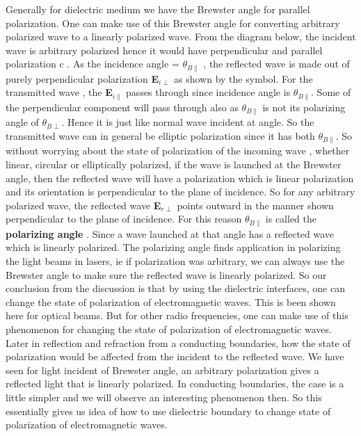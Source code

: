 Generally for dielectric medium we have the Brewster  angle for parallel polarization. One can make use of this Brewster  angle for converting arbitrary polarized wave to a linearly polarized wave. From the diagram below, the incident wave is arbitrary polarized hence it would have perpendicular and parallel polarization c . As the incidence angle = $\theta_{B\parallel}$ , the reflected wave is made out of purely perpendicular polarization \textbf{E}$_{i\perp}$ as shown by the symbol. For the transmitted wave , the \textbf{E}$_{i\parallel}$ passes through since incidence angle is $\theta_{B\parallel}$. Some of the perpendicular component will pass through also as $\theta_{B\parallel}$ is not its polarizing angle of $\theta_{B\perp}$. Hence it is just like normal wave incident at angle. So the transmitted wave can in general be elliptic polarization since it has both $\theta_{B\parallel}$. So without worrying about the state of polarization of the incoming wave , whether linear, circular or elliptically polarized, if the wave is launched at the Brewster  angle, then the reflected wave will have a polarization which is linear polarization and its orientation is perpendicular to the plane of incidence. So for any arbitrary polarized wave, the reflected wave \textbf{E}$_{r\perp}$ points outward in the manner shown perpendicular to the plane of incidence. For this reason $\theta_{B\parallel}$ is called the \textbf{polarizing angle} . Since a wave launched at that angle has a reflected wave which is linearly polarized. The polarizing angle finds application in polarizing the light beams in lasers, ie if polarization was arbitrary, we can always use the Brewster angle to make sure the reflected wave is linearly polarized. 
So our conclusion from the discussion is that by using the dielectric interfaces, one can change the state of polarization of electromagnetic waves. This is been shown here for optical beams. But for other radio frequencies, one can make use of this phenomenon for changing the state of polarization of electromagnetic waves.
Later in reflection and refraction from a conducting boundaries, how the state of polarization would be affected from the incident to the reflected wave.  We have seen for light incident of Brewster angle, an arbitrary polarization gives a reflected light that is linearly polarized. In conducting boundaries, the case is a little simpler and we will observe an interesting phenomenon then. So this essentially gives us idea of how to use dielectric boundary to change state of polarization of electromagnetic waves. 
